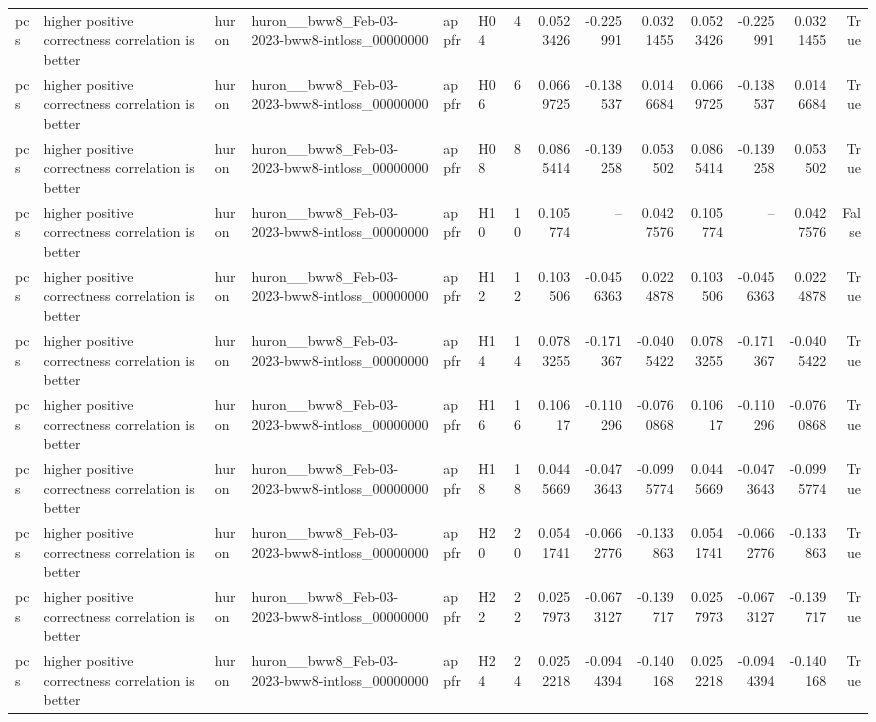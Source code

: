 \begin{longtable}{llllllrrrrrrrr}
pcs & higher positive correctness correlation is better & huron & huron\_\_bww8\_Feb-03-2023-bww8-intloss\_00000000 & appfr & H04 & 4 & 0.0523426 & -0.225991 & 0.0321455 & 0.0523426 & -0.225991 & 0.0321455 & True \\
pcs & higher positive correctness correlation is better & huron & huron\_\_bww8\_Feb-03-2023-bww8-intloss\_00000000 & appfr & H06 & 6 & 0.0669725 & -0.138537 & 0.0146684 & 0.0669725 & -0.138537 & 0.0146684 & True \\
pcs & higher positive correctness correlation is better & huron & huron\_\_bww8\_Feb-03-2023-bww8-intloss\_00000000 & appfr & H08 & 8 & 0.0865414 & -0.139258 & 0.053502 & 0.0865414 & -0.139258 & 0.053502 & True \\
pcs & higher positive correctness correlation is better & huron & huron\_\_bww8\_Feb-03-2023-bww8-intloss\_00000000 & appfr & H10 & 10 & 0.105774 & -- & 0.0427576 & 0.105774 & -- & 0.0427576 & False \\
pcs & higher positive correctness correlation is better & huron & huron\_\_bww8\_Feb-03-2023-bww8-intloss\_00000000 & appfr & H12 & 12 & 0.103506 & -0.0456363 & 0.0224878 & 0.103506 & -0.0456363 & 0.0224878 & True \\
pcs & higher positive correctness correlation is better & huron & huron\_\_bww8\_Feb-03-2023-bww8-intloss\_00000000 & appfr & H14 & 14 & 0.0783255 & -0.171367 & -0.0405422 & 0.0783255 & -0.171367 & -0.0405422 & True \\
pcs & higher positive correctness correlation is better & huron & huron\_\_bww8\_Feb-03-2023-bww8-intloss\_00000000 & appfr & H16 & 16 & 0.10617 & -0.110296 & -0.0760868 & 0.10617 & -0.110296 & -0.0760868 & True \\
pcs & higher positive correctness correlation is better & huron & huron\_\_bww8\_Feb-03-2023-bww8-intloss\_00000000 & appfr & H18 & 18 & 0.0445669 & -0.0473643 & -0.0995774 & 0.0445669 & -0.0473643 & -0.0995774 & True \\
pcs & higher positive correctness correlation is better & huron & huron\_\_bww8\_Feb-03-2023-bww8-intloss\_00000000 & appfr & H20 & 20 & 0.0541741 & -0.0662776 & -0.133863 & 0.0541741 & -0.0662776 & -0.133863 & True \\
pcs & higher positive correctness correlation is better & huron & huron\_\_bww8\_Feb-03-2023-bww8-intloss\_00000000 & appfr & H22 & 22 & 0.0257973 & -0.0673127 & -0.139717 & 0.0257973 & -0.0673127 & -0.139717 & True \\
pcs & higher positive correctness correlation is better & huron & huron\_\_bww8\_Feb-03-2023-bww8-intloss\_00000000 & appfr & H24 & 24 & 0.0252218 & -0.0944394 & -0.140168 & 0.0252218 & -0.0944394 & -0.140168 & True \\

\end{longtable}
